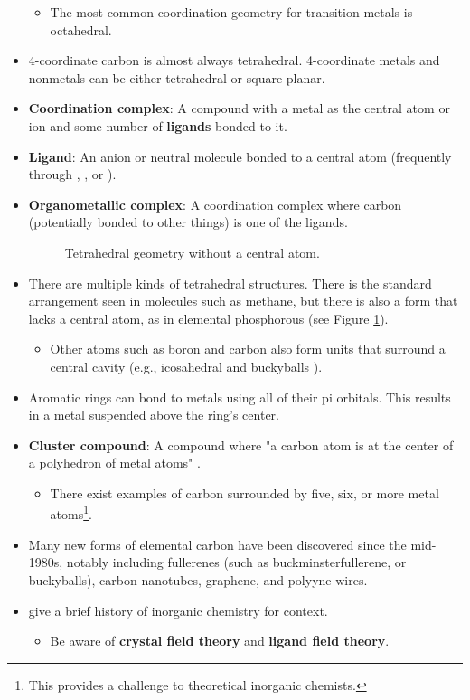 \documentclass[../main.tex]{subfiles}
\begin{document}
\begin{itemize}
    \begin{itemize}
        \item The most common coordination geometry for transition metals is octahedral.
    \end{itemize}
    \item 4-coordinate carbon is almost always tetrahedral. 4-coordinate metals and nonmetals can be either tetrahedral or square planar.
    \item \textbf{Coordination complex}: A compound with a metal as the central atom or ion and some number of \textbf{ligands} bonded to it.
    \item \textbf{Ligand}: An anion or neutral molecule bonded to a central atom (frequently through , , or ).
    \item \textbf{Organometallic complex}: A coordination complex where carbon (potentially bonded to other things) is one of the ligands.
    \begin{figure}[h!]
        \centering
        \footnotesize
        \caption{Tetrahedral geometry without a central atom.}
        \label{fig:tetrahedralNoCentral}
    \end{figure}
    \item There are multiple kinds of tetrahedral structures. There is the standard arrangement seen in molecules such as methane, but there is also a form that lacks a central atom, as in elemental phosphorous  (see Figure \ref{fig:tetrahedralNoCentral}).
    \begin{itemize}
        \item Other atoms such as boron and carbon also form units that surround a central cavity (e.g., icosahedral  and buckyballs ).
    \end{itemize}
    \item Aromatic rings can bond to metals using all of their pi orbitals. This results in a metal suspended above the ring's center.
    \item \textbf{Cluster compound}: A compound where "a carbon atom is at the center of a polyhedron of metal atoms" \parencite[3]{bib:MiesslerFischerTarr}.
    \begin{itemize}
        \item There exist examples of carbon surrounded by five, six, or more metal atoms\footnote{This provides a challenge to theoretical inorganic chemists.}.
    \end{itemize}
    \item Many new forms of elemental carbon have been discovered since the mid-1980s, notably including fullerenes (such as buckminsterfullerene, or buckyballs), carbon nanotubes, graphene, and polyyne wires.
    \item \textcite{bib:MiesslerFischerTarr} give a brief history of inorganic chemistry for context.
    \begin{itemize}
        \item Be aware of \textbf{crystal field theory} and \textbf{ligand field theory}.
    \end{itemize}
\end{itemize}
\end{document}
